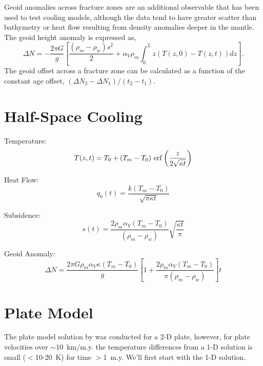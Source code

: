 \documentclass[final,12pt,a4paper]{article}
\begin{document}
Geoid anomalies across fracture zones are an additional observable that
has been used to test cooling models, although the data tend to have
greater scatter than bathymetry or heat flow resulting from density
anomalies deeper in the mantle.  The geoid height anomaly is expressed
as,
\begin{equation}
    \Delta N = -\frac{2 \pi G}{g} \left[
        \frac{(\rho_{m} - \rho_{w}) s^2}{2}
        + \alpha_{V} \rho_{m} \int_{0}^{L} z ( T(z,0) - T(z,t) ) dz
        \right].
    \label{eq-geoid}
\end{equation}
The geoid offset across a fracture zone can be calculated as a function
of the constant age offset, $(\Delta N_{2} - \Delta N_{1}) / (t_{2} -
t_{1})$. 


\section{Half-Space Cooling}
Temperature:
\begin{equation}
    T(z,t) = T_{0} + (T_{m} - T_{0})\,
        \erf\left( \frac{z}{2\sqrt{\kappa t}} \right)
\end{equation}

Heat Flow:
\begin{equation}
    q_{0}(t) = \frac{k (T_{m} - T_{0})}{\sqrt{\pi \kappa t}}
\end{equation}

Subsidence:
\begin{equation}
    s(t) = \frac{2 \rho_{m} \alpha_{V} (T_{m} - T_{0})}
        {(\rho_{m} - \rho_{w})}\sqrt{\frac{\kappa t}{\pi}}
\end{equation}

Geoid Anomaly:
\begin{equation}
    \Delta N = 
        \frac{2 \pi G \rho_{m} \alpha_{V} \kappa (T_{m} - T_{0})}{g}
        \left[ 
            1 + \frac{2 \rho_{m} \alpha_{V} (T_{m} - T_{0})}
            {\pi (\rho_{m} - \rho_{w})}
        \right] t
\end{equation}


\section{Plate Model}

The plate model solution by \cite{McKenzie1967} was conducted for a 2-D
plate, however, for plate velocities over $\sim$10~km/m.y. the
temperature differences from a 1-D solution is small ($<$10-20~K) for
time $>$1~m.y.  We'll first start with the 1-D solution.
\end{document}
